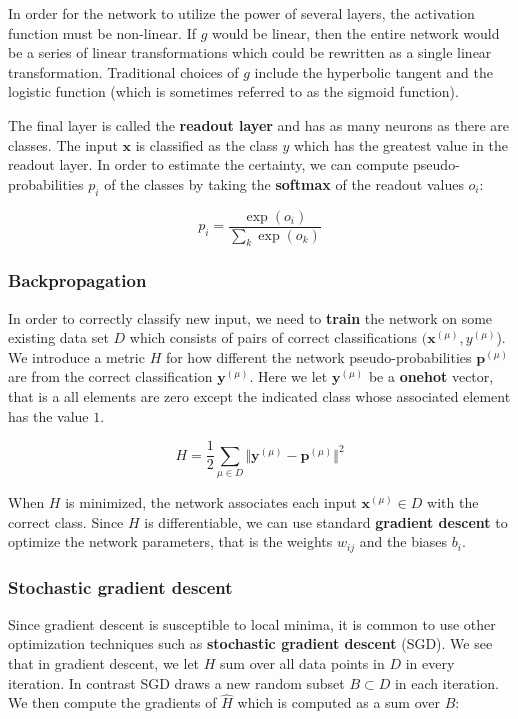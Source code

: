 In order for the network to utilize the power of several layers, the activation function must be non-linear. If $g$ would be linear, then the entire network would be a series of linear transformations which could be rewritten as a single linear transformation. Traditional choices of $g$ include the hyperbolic tangent and the logistic function (which is sometimes referred to as the sigmoid function).

The final layer is called the \textbf{readout layer} and has as many neurons as there are classes. The input $\mathbf{x}$ is classified as the class $y$ which has the greatest value in the readout layer. In order to estimate the certainty, we can compute pseudo-probabilities $p_i$ of the classes by taking the \textbf{softmax} of the readout values $o_i$:

\[
p_i = \frac{ \exp(o_i) }{ \sum_k \exp(o_k) }
\]

\subsubsection{Backpropagation}

In order to correctly classify new input, we need to \textbf{train} the network on some existing data set $D$ which consists of pairs of correct classifications $(\mathbf{x}^{(\mu)}, y^{(\mu)}$).
We introduce a metric $H$ for how different the network pseudo-probabilities $\mathbf{p}^{(\mu)}$ are from the correct classification $\mathbf{y}^{(\mu)}$. Here we let $\mathbf{y}^{(\mu)}$ be a \textbf{onehot} vector, that is a all elements are zero except the indicated class whose associated element has the value $1$.

\[
H = \frac{1}{2} \sum_{\mu \in D} \Vert
  \mathbf{y}^{(\mu)} - \mathbf{p}^{(\mu)}
\Vert ^2
\]

When $H$ is minimized, the network associates each input $\mathbf{x}^{(\mu)} \in D$ with the correct class. Since $H$ is differentiable, we can use standard \textbf{gradient descent} to optimize the network parameters, that is the weights $w_{ij}$ and the biases $b_i$.

\subsubsection{Stochastic gradient descent}

Since gradient descent is susceptible to local minima, it is common to use other optimization techniques such as \textbf{stochastic gradient descent} (SGD).
We see that in gradient descent, we let $H$ sum over all data points in $D$ in every iteration. In contrast SGD draws a new random subset $B \subset D$ in each iteration. We then compute the gradients of $\hat{H}$ which is computed as a sum over $B$:

